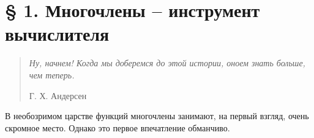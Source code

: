 


\section*{§ 1. Многочлены -- инструмент вычислителя}
\begin{quote}
\small\textit{Ну, начнем! Когда мы доберемся до 
этой истории, оноем знать
больше, чем теперь.}

\hfill{Г. Х. Андерсен}
\end{quote}

\noindent В необозримом царстве функций многочлены занимают, на первый взгляд, очень скромное место. Однако это первое впечатление обманчиво.

